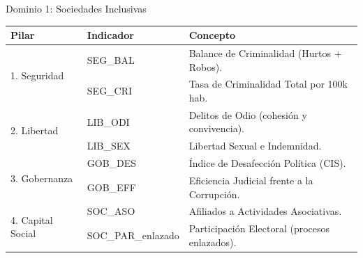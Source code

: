 \documentclass[10pt, aspectratio=169]{beamer}
\begin{document}
\begin{frame}{Dominio 1: Sociedades Inclusivas}
    \begin{table}
        \centering
        \footnotesize
        \begin{tabular}{llp{7cm}}
            \toprule
            \textbf{Pilar} & \textbf{Indicador} & \textbf{Concepto} \\
            \midrule
            \multirow{2}{*}{1. Seguridad} & SEG\_BAL & Balance de Criminalidad (Hurtos + Robos). \\
             & SEG\_CRI & Tasa de Criminalidad Total por 100k hab. \\
            \midrule
            \multirow{2}{*}{2. Libertad} & LIB\_ODI & Delitos de Odio (cohesión y convivencia). \\
             & LIB\_SEX & Libertad Sexual e Indemnidad. \\
            \midrule
            \multirow{2}{*}{3. Gobernanza} & GOB\_DES & Índice de Desafección Política (CIS). \\
             & GOB\_EFF & Eficiencia Judicial frente a la Corrupción. \\
            \midrule
            \multirow{2}{*}{4. Capital Social} & SOC\_ASO & Afiliados a Actividades Asociativas. \\
             & SOC\_PAR\_enlazado & Participación Electoral (procesos enlazados). \\
            \bottomrule
        \end{tabular}
    \end{table}
\end{frame}
\end{document}

